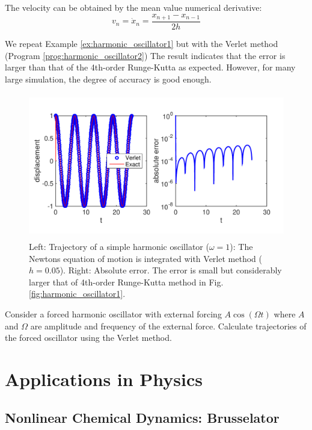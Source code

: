 The velocity can be obtained by the mean value 
numerical derivative:
\begin{equation}
v_n = \dot{x}_n = \frac{x_{n+1} - x_{n-1}}{2h}
\end{equation}




\bigskip
\begin{example}\label{eq:harmonic_oscillator2} 
We repeat Example \ref{ex:harmonic_oscillator1} but with the Verlet method (Program \ref{prog:harmonic_oscillator2})  The result indicates that the error is larger than that of the 4th-order Runge-Kutta as expected.  However, for many large simulation, the degree of accuracy is good enough.

\begin{figure}
\centerline{\includegraphics[height=2.5in]{05.ode1/harmonic_oscillator2.pdf}}
\caption{Left: Trajectory of a simple harmonic oscillator ($\omega=1$): The Newtons equation of motion is integrated with Verlet method ($h=0.05$).  Right: Absolute error. The error is small but considerably larger that of 4th-order Runge-Kutta method in Fig. \ref{fig:harmonic_oscillator1}. }
\label{fig:harmonic_oscillator2}
\end{figure}

\exercise
Consider a forced harmonic oscillator with external forcing $A \cos(\Omega t)$ where $A$ and $\Omega$ are amplitude and frequency of the external force.  Calculate trajectories of the forced oscillator using the Verlet method.
\end{example}

\section{Applications in Physics}

\subsection{Nonlinear Chemical Dynamics: Brusselator}

